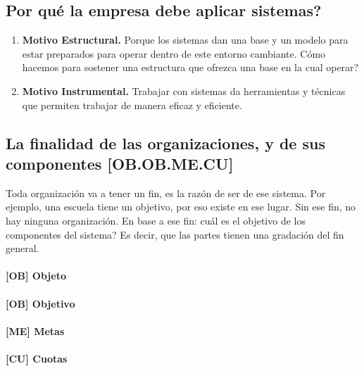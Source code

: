 \hypertarget{por-quuxe9-la-empresa-debe-aplicar-sistemas}{%
\subsection*{Por qué la empresa debe aplicar
sistemas?}\label{por-quuxe9-la-empresa-debe-aplicar-sistemas}}

\begin{enumerate}
\def\labelenumi{\arabic{enumi}.}
\item
  \textbf{Motivo Estructural.} Porque los sistemas dan una base y un modelo para
  estar preparados para operar dentro de este entorno cambiante. Cómo
  hacemos para sostener una estructura que ofrezca una base en la cual
  operar?
\item
  \textbf{Motivo Instrumental.} Trabajar con sistemas da herramientas y técnicas
  que permiten trabajar de manera eficaz y eficiente.
\end{enumerate}

\hypertarget{la-finalidad-de-las-organizaciones-y-de-sus-componentes-ob.ob.me.cu}{%
\subsection{La finalidad de las organizaciones, y de sus componentes
{[}OB.OB.ME.CU{]}}\label{la-finalidad-de-las-organizaciones-y-de-sus-componentes-ob.ob.me.cu}}

Toda organización va a tener un fin, es la razón de ser de ese sistema.
Por ejemplo, una escuela tiene un objetivo, por eso existe en ese lugar.
Sin ese fin, no hay ninguna organización. En base a ese fin: cuál es el
objetivo de los componentes del sistema? Es decir, que las partes tienen
una gradación del fin general. 
\paragraph{{[}OB{]} Objeto}
\paragraph{{[}OB{]} Objetivo}
\paragraph{{[}ME{]} Metas}
\paragraph{{[}CU{]} Cuotas}

